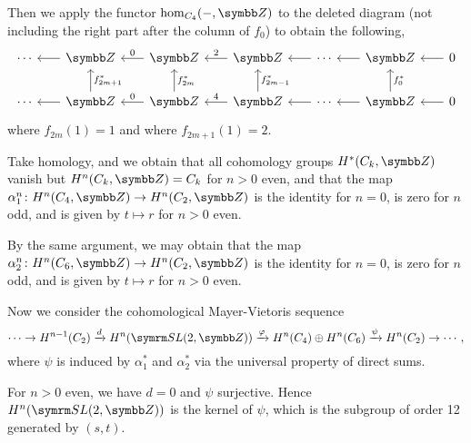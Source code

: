 Then we apply the functor $\HOM_{\CYC4}(\BLANK, \ZZ)$ to the deleted diagram (not including the right part after the column of $f_0$) to obtain the following,
\begin{equation*}
  \begin{tikzcd}[column sep=scriptsize]
    \dotsb & \ZZ & \ZZ & \ZZ & \dotsb & \ZZ & 0\\
    \dotsb & \ZZ & \ZZ & \ZZ & \dotsb & \ZZ & 0
    \arrow[from=1-1,leftarrow,]{1-2}[]{}
    \arrow[from=1-2,leftarrow,]{1-3}[]{0}
    \arrow[from=1-3,leftarrow,]{1-4}[]{2}
    \arrow[from=1-4,leftarrow,]{1-5}[]{}
    \arrow[from=1-5,leftarrow,]{1-6}[]{}
    \arrow[from=1-6,leftarrow,]{1-7}[]{}
    \arrow[from=2-1,leftarrow,]{2-2}[]{}
    \arrow[from=2-2,leftarrow,]{2-3}[]{0}
    \arrow[from=2-3,leftarrow,]{2-4}[]{4}
    \arrow[from=2-4,leftarrow,]{2-5}[]{}
    \arrow[from=2-5,leftarrow,]{2-6}[]{}
    \arrow[from=2-6,leftarrow,]{2-7}[]{}
    \arrow[from=1-2,leftarrow,]{2-2}[]{f_{2m+1}^*}
    \arrow[from=1-3,leftarrow,]{2-3}[]{f_{2m}^*}
    \arrow[from=1-4,leftarrow,]{2-4}[]{f_{2m-1}^*}
    \arrow[from=1-6,leftarrow,]{2-6}[]{f_0^*}
  \end{tikzcd}
\end{equation*}
where $f_{2m}(1)=1$ and where $f_{2m+1}(1)=2$.

Take homology, and we obtain that all cohomology groups $H^*(\CYC{k}, \ZZ)$ vanish but $H^n(\CYC{k}, \ZZ)=\CYC{k}$ for $n>0$ even, and that the map $\alpha_1^n\colon H^n(\CYC4, \ZZ)\to H^n(\CYC2, \ZZ)$ is the identity for $n=0$, is zero for $n$ odd, and is given by $t\mapsto r$ for $n>0$ even.

By the same argument, we may obtain that the map $\alpha_2^n\colon H^n(\CYC6, \ZZ)\to H^n(\CYC2, \ZZ)$ is the identity for $n=0$, is zero for $n$ odd, and is given by $t\mapsto r$ for $n>0$ even.

\vspace{\baselineskip}

Now we consider the cohomological Mayer-Vietoris sequence
\begin{equation*}
  \dotsb\to H^{n-1}(\CYC2)\xrightarrow{d} H^n(\SLtZ)\xrightarrow{\varphi} H^n(\CYC4)\oplus H^n(\CYC6)\xrightarrow{\psi} H^n(\CYC2)\to\dotsb,
\end{equation*}
where $\psi$ is induced by $\alpha_1^*$ and $\alpha_2^*$ via the universal property of direct sums.

For $n>0$ even, we have $d=0$ and $\psi$ surjective. Hence $H^n(\SLtZ)$ is the kernel of $\psi$, which is the subgroup of order 12 generated by $(s, t)$.


